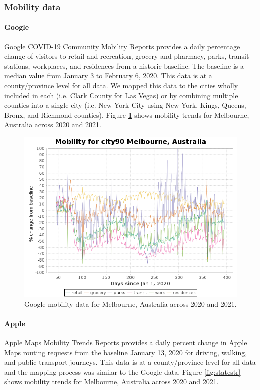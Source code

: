 \documentclass[final,3p,times,authoryear]{elsarticle}
\begin{document}
\subsubsection{Mobility data}
\paragraph{Google}

Google COVID-19 Community Mobility Reports \citep{Google2020} provides a  daily percentage change of visitors to retail and recreation, grocery and pharmacy, parks, transit stations, workplaces, and residences from a historic baseline. The baseline is a median value from January 3 to February 6, 2020. This data is at a county/province level for all data. We mapped this data to the cities wholly included in each (i.e. Clark County for Las Vegas) or by combining multiple counties into a single city (i.e. New York City using New York, Kings, Queens, Bronx, and Richmond counties). Figure \ref{fig:googlemobility} shows mobility trends for Melbourne, Australia across 2020 and 2021.

\begin{figure}
\centering
\includegraphics[width=.99\linewidth]{images/city90MelbourneAustralia.png}
\caption{Google mobility data for Melbourne, Australia across 2020 and 2021.}
 \label{fig:googlemobility}
\end{figure}


\paragraph{Apple}
Apple Maps Mobility Trends Reports \citep{Apple2020} provides a daily percent change in Apple Maps routing requests from the baseline January 13, 2020 for driving, walking, and public transport journeys. This data is at a county/province level for all data and the mapping process was similar to the Google data. Figure \ref{fig:statestr} shows mobility trends for Melbourne, Australia across 2020 and 2021.
\end{document}
